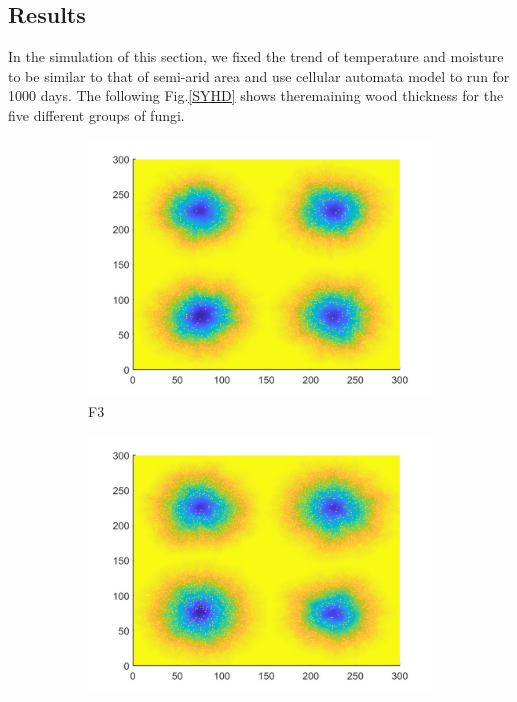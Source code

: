 \documentclass{mcmthesis}
\begin{document}
\subsection{Results}
\par In the simulation of this section, we fixed the trend of temperature and moisture to be similar to that of semi-arid area and use cellular automata model to run for 1000 days. The following Fig.\eqref{SYHD} shows theremaining wood thickness for the five different groups of fungi.
\begin{figure}[H]
	\centering
	\begin{subfigure}{0.3\textwidth}
		\includegraphics[width=\textwidth]{./T5Figure/K1N1/K1N1L.pdf}
		\caption{F3}
	\end{subfigure}
	\begin{subfigure}{0.3\textwidth}
		\includegraphics[width=\textwidth]{./T5Figure/K1N2/K1N2L.pdf}

\end{subfigure}
\end{figure}
\end{document}

